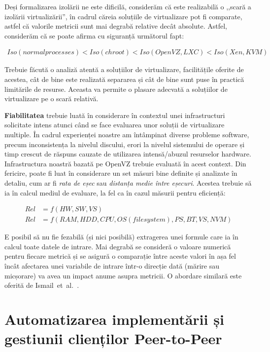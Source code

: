 Deși formalizarea izolării ne este dificilă, considerăm că este realizabilă
o ,,scară a izolării virtualizării'', în cadrul căreia soluțiile de
virtualizare pot fi comparate, astfel că valorile metricii sunt mai degrabă
relative decât absolute. Astfel, considerăm că se poate afirma cu 
siguranță următorul fapt:

\begin{align}
Iso(normal processes) < Iso(chroot) < Iso(OpenVZ, LXC) < Iso(Xen,KVM)
\end{align}

Trebuie făcută o analiză atentă a soluțiilor de virtualizare, facilitățile
oferite de acestea, cât de bine este realizată separarea și cât de bine
sunt puse în practică limitările de resurse. Aceasta va permite o plasare
adecvată a soluțiilor de virtualizare pe o scară relativă.

\textbf{Fiabilitatea} trebuie luată în considerare în contextul unei
infrastructuri solicitate intens atunci când se face evaluarea unor soluții
de virtualizare multiple. În cadrul experienței noastre am întâmpinat
diverse probleme software, precum inconsistența la nivelul discului, erori
la nivelul sistemului de operare și timp crescut de răspuns cauzate de
utilizarea intensă/abuzul resurselor hardware. Infrastructura noastră
bazată pe OpenVZ trebuie evaluată în acest context. Din fericire, poate fi
luat în considerare un set măsuri bine definite și analizate în detaliu,
cum ar fi \textit{rata de eșec} sau \textit{distanța medie între eșecuri}.
Acestea trebuie să ia în calcul mediul de evaluare, la fel ca în cazul
măsurii pentru eficiență:

\begin{align}
Rel & = f(HW, SW, VS)\\
Rel & = f(RAM, HDD, CPU, OS (filesystem), PS, BT, VS, NVM)
\end{align}

E posibil să nu fie fezabilă (și nici posibilă) extragerea unei
formule care ia în calcul toate datele de intrare. Mai degrabă se consideră
o valoare numerică pentru fiecare metrică și se asigură o comparație între
aceste valori în așa fel încât afectarea unei variabile de intrare într-o
direcție dată (mărire sau micșorare) va avea un impact anume asupra
metricii. O abordare similară este oferită de
Ismail~et~al.~\cite{virt-metrics}.

\section{Automatizarea implementării și gestiunii clienților Peer-to-Peer}
\label{sec:virt-infra:auto-deploy}

